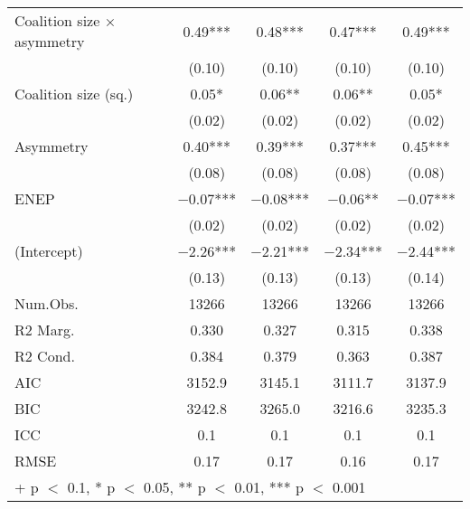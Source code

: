 \begin{table}
\begin{tabular}[t]{lcccc}
Coalition size × asymmetry & \num{0.49}*** & \num{0.48}*** & \num{0.47}*** & \num{0.49}***\\
 & (\num{0.10}) & (\num{0.10}) & (\num{0.10}) & (\num{0.10})\\
Coalition size (sq.) & \num{0.05}* & \num{0.06}** & \num{0.06}** & \num{0.05}*\\
 & (\num{0.02}) & (\num{0.02}) & (\num{0.02}) & \vphantom{1} (\num{0.02})\\
Asymmetry & \num{0.40}*** & \num{0.39}*** & \num{0.37}*** & \num{0.45}***\\
 & (\num{0.08}) & (\num{0.08}) & (\num{0.08}) & (\num{0.08})\\
ENEP & \num{-0.07}*** & \num{-0.08}*** & \num{-0.06}** & \num{-0.07}***\\
 & (\num{0.02}) & (\num{0.02}) & (\num{0.02}) & (\num{0.02})\\
(Intercept) & \num{-2.26}*** & \num{-2.21}*** & \num{-2.34}*** & \num{-2.44}***\\
 & (\num{0.13}) & (\num{0.13}) & (\num{0.13}) & (\num{0.14})\\
\midrule
Num.Obs. & \num{13266} & \num{13266} & \num{13266} & \num{13266}\\
R2 Marg. & \num{0.330} & \num{0.327} & \num{0.315} & \num{0.338}\\
R2 Cond. & \num{0.384} & \num{0.379} & \num{0.363} & \num{0.387}\\
AIC & \num{3152.9} & \num{3145.1} & \num{3111.7} & \num{3137.9}\\
BIC & \num{3242.8} & \num{3265.0} & \num{3216.6} & \num{3235.3}\\
ICC & \num{0.1} & \num{0.1} & \num{0.1} & \num{0.1}\\
RMSE & \num{0.17} & \num{0.17} & \num{0.16} & \num{0.17}\\
\bottomrule
\multicolumn{5}{l}{\rule{0pt}{1em}+ p $<$ 0.1, * p $<$ 0.05, ** p $<$ 0.01, *** p $<$ 0.001}\\
\end{tabular}
\end{table}
